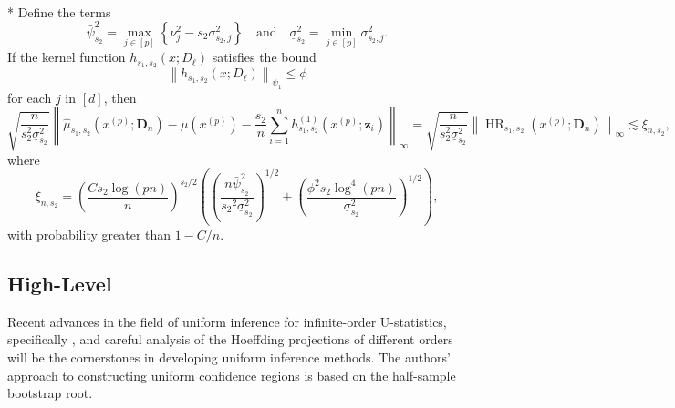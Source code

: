 \begin{boxD}
	\begin{thm}\label{thm:rit4_2}\mbox{}\\*
		Define the terms
		\begin{equation}
			\bar{\psi}_{s_2}^2
			= \max_{j \in[p]}\left\{\nu_j^2- s_2 \sigma_{s_2, j}^2\right\}
			\quad \text {and} \quad
			\underline{\sigma}_{s_2}^2
			= \min_{j \in[p]} \sigma_{s_2, j}^2.
		\end{equation}
		If the kernel function $h_{s_1, s_2}\left(x ; D_{\ell}\right)$ satisfies the bound
		\begin{equation}
			\left\|h_{s_1, s_2}\left(x ; D_{\ell}\right)\right\|_{\psi_1} \leq \phi
		\end{equation}
		for each $j$ in $[d]$, then
		\begin{equation}
			\sqrt{\frac{n}{s_2^2 \underline{\sigma}_{s_2}^2}}
			\left\|\hat{\mu}_{s_1, s_2}(x^{(p)}; \mathbf{D}_n) - \mu(x^{(p)}) - \frac{s_2}{n} \sum_{i=1}^n h^{(1)}_{s_1, s_2}(x^{(p)}; \mathbf{z}_{i})\right\|_{\infty}
			= \sqrt{\frac{n}{s_2^2 \underline{\sigma}_{s_2}^2}} \left\|\operatorname{HR}_{s_1, s_2}(x^{(p)}; \mathbf{D}_n)\right\|_{\infty}
			\lesssim \xi_{n, s_2},
		\end{equation}
		where
		\begin{equation}
			\xi_{n, s_2}
			= \left(\frac{C s_2 \log(p n)}{n}\right)^{s_2 / 2}\left(\left(\frac{n \bar{\psi}_{s_2}^2}{{s_2}^2 \underline{\sigma}_{s_2}^2}\right)^{1 / 2}+\left(\frac{\phi^2 s_2 \log ^4(p n)}{\underline{\sigma}_{s_2}^2}\right)^{1 / 2}\right),
		\end{equation}
		with probability greater than $1-C / n$.
	\end{thm}
\end{boxD}

\subsection{High-Level}
Recent advances in the field of uniform inference for infinite-order U-statistics, specifically \citet{ritzwoller_simultaneous_2024}, and careful analysis of the Hoeffding projections of different orders will be the cornerstones in developing uniform inference methods.
The authors' approach to constructing uniform confidence regions is based on the half-sample bootstrap root.


